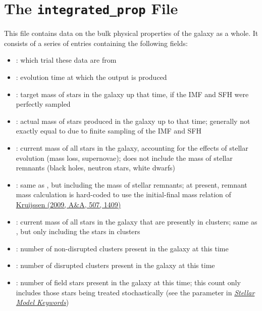 \documentclass[letterpaper,10pt,english]{sphinxmanual}
\begin{document}
\section{The \texttt{integrated\_prop} File}
\label{output:the-integrated-prop-file}
This file contains data on the bulk physical properties of the galaxy as a whole. It consists of a series of entries containing the following fields:
\begin{itemize}
\item {} 
: which trial these data are from

\item {} 
: evolution time at which the output is produced

\item {} 
: target mass of stars in the galaxy up that time, if the IMF and SFH were perfectly sampled

\item {} 
: actual mass of stars produced in the galaxy up to that time; generally not exactly equal to  due to finite sampling of the IMF and SFH

\item {} 
:  current mass of all stars in the galaxy, accounting for the effects of stellar evolution (mass loss, supernovae); does not include the mass of stellar remnants (black holes, neutron stars, white dwarfs)

\item {} 
: same as , but including the mass of stellar remnants; at present, remnant mass calculation is hard-coded to use the initial-final mass relation of \href{http://adsabs.harvard.edu/abs/2009A\%26A...507.1409K}{Kruijssen (2009, A\&A, 507, 1409)}

\item {} 
: current mass of all stars in the galaxy that are presently in clusters; same as , but only including the stars in clusters

\item {} 
: number of non-disrupted clusters present in the galaxy at this time

\item {} 
: number of disrupted clusters present in the galaxy at this time

\item {} 
: number of field stars present in the galaxy at this time; this count only includes those stars being treated stochastically (see the parameter  in {\hyperref[parameters:ssec\string-stellar\string-keywords]{\emph{Stellar Model Keywords}}})

\end{itemize}
\end{document}
